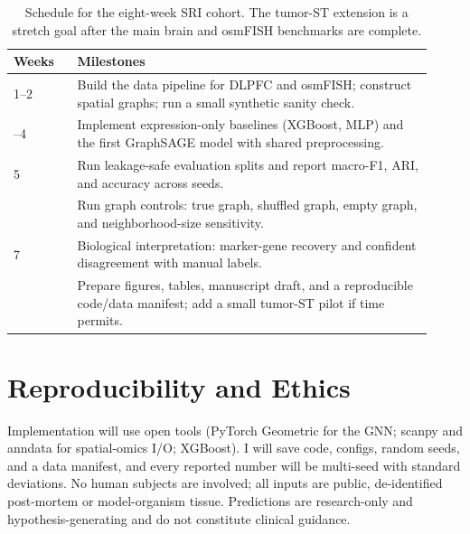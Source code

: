 \documentclass[11pt]{article}
\begin{document}
\begin{table}[H]
\centering\small
\begin{tabular}{>{\raggedright\arraybackslash}p{0.14\linewidth} >{\raggedright\arraybackslash}p{0.78\linewidth}}
\toprule
\rowcolor{sriblue}\color{white}\textbf{Weeks} & \color{white}\textbf{Milestones}\\
\midrule
\rowcolor{srirow} 1--2 & Build the data pipeline for DLPFC and osmFISH; construct spatial graphs; run a small synthetic sanity check.\\
3--4 & Implement expression-only baselines (XGBoost, MLP) and the first GraphSAGE model with shared preprocessing.\\
\rowcolor{srirow} 5 & Run leakage-safe evaluation splits and report macro-F1, ARI, and accuracy across seeds.\\
6 & Run graph controls: true graph, shuffled graph, empty graph, and neighborhood-size sensitivity.\\
\rowcolor{srirow} 7 & Biological interpretation: marker-gene recovery and confident disagreement with manual labels.\\
8 & Prepare figures, tables, manuscript draft, and a reproducible code/data manifest; add a small tumor-ST pilot if time permits.\\
\bottomrule
\end{tabular}
\caption{Schedule for the eight-week SRI cohort. The tumor-ST extension is a
stretch goal after the main brain and osmFISH benchmarks are complete.}
\label{tab:timeline}
\end{table}

\section{Reproducibility and Ethics}

Implementation will use open tools (PyTorch Geometric for the GNN; scanpy and anndata
for spatial-omics I/O; XGBoost). I will save code, configs, random seeds, and a
data manifest, and every reported number will be multi-seed with standard
deviations. No human subjects are involved; all inputs are public, de-identified
post-mortem or model-organism tissue. Predictions are research-only and
hypothesis-generating and do not constitute clinical guidance.
\end{document}
